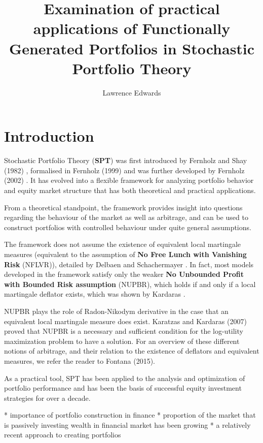 \documentclass[british]{amsart}
\numberwithin{equation}{section}
\numberwithin{figure}{section}
\theoremstyle{plain}
\theoremstyle{definition}
\theoremstyle{plain}
\theoremstyle{plain}
\theoremstyle{plain}
\theoremstyle{remark}
\theoremstyle{plain}
\begin{document}
\title{Examination of practical applications of Functionally Generated 
Portfolios in Stochastic Portfolio Theory}
\author{Lawrence Edwards}
\maketitle

\tableofcontents{}

\section{Introduction}
Stochastic Portfolio Theory (\textbf{SPT}) was first introduced by Fernholz and 
Shay (1982) \cite{fernholz1982}, formalised in Fernholz (1999) 
\cite{fernholz1999} and was further developed by Fernholz (2002) 
\cite{fernholz2002}. It has evolved into a flexible framework for analyzing 
portfolio behavior and equity market structure that has both theoretical and 
practical applications.

From a theoretical standpoint, the framework provides insight into questions 
regarding the behaviour of the market as well as arbitrage, and can be used to 
construct portfolios with controlled behaviour under quite general assumptions. 

The framework does not assume the existence of equivalent local martingale
measures (equivalent to the assumption of \textbf{No Free Lunch with Vanishing 
Risk} (NFLVR)), detailed by Delbaen and Schachermayer \cite{delbaen1994}. In 
fact, most models developed in the framework satisfy only the weaker \textbf{No 
Unbounded Profit with Bounded Risk assumption} (NUPBR), which holds if and only 
if a local martingale deflator exists, which was shown by Kardaras 
\cite{kardaras2012}. 

NUPBR plays the role of Radon-Nikodym derivative in the case that an equivalent
local martingale measure does exist.  Karatzas and Kardaras (2007) proved that 
NUPBR is a necessary and sufficient condition for the log-utility maximization 
problem to have a solution. For an overview of these different notions of 
arbitrage, and their relation to the existence of deflators and equivalent 
measures, we refer the reader to Fontana (2015).

As a practical tool, SPT has been applied to the analysis and optimization of 
portfolio performance and has been the basis of successful equity investment 
strategies for over a decade.

* importance of portfolio construction in finance
* proportion of the market that is passively investing wealth in financial 
market has been growing
* a relatively recent approach to creating portfolios
\end{document}
